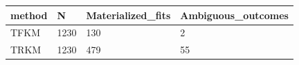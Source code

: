 \begin{tabular}{llll}
\toprule
method & N & Materialized\_fits & Ambiguous\_outcomes \\
\midrule
TFKM & 1230 & 130 & 2 \\
TRKM & 1230 & 479 & 55 \\
\bottomrule
\end{tabular}
